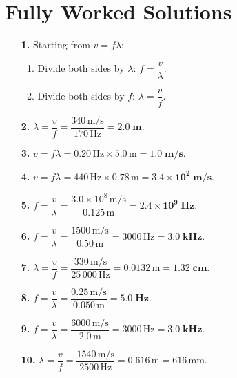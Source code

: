 \documentclass[12pt]{article}
\begin{document}
\newpage
\section*{Fully Worked Solutions}

\begin{enumerate}
    \item[\textbf{1.}] Starting from \(v = f\lambda\):
        \begin{enumerate}
            \item Divide both sides by \(\lambda\): \(f = \dfrac{v}{\lambda}\).
            \item Divide both sides by \(f\): \(\lambda = \dfrac{v}{f}\).
        \end{enumerate}

    \item[\textbf{2.}] \(\lambda = \dfrac{v}{f} = \dfrac{340\,\text{m/s}}{170\,\text{Hz}} = \mathbf{2.0\;m}\).

    \item[\textbf{3.}] \(v = f\lambda = 0.20\,\text{Hz} \times 5.0\,\text{m} = \mathbf{1.0\;m/s}\).

    \item[\textbf{4.}] \(v = f\lambda = 440\,\text{Hz} \times 0.78\,\text{m} = \mathbf{3.4 \times 10^{2}\;m/s}\).

    \item[\textbf{5.}] \(f = \dfrac{v}{\lambda} = \dfrac{3.0\times10^{8}\,\text{m/s}}{0.125\,\text{m}} = \mathbf{2.4 \times 10^{9}\;Hz}\).

    \item[\textbf{6.}] \(f = \dfrac{v}{\lambda} = \dfrac{1500\,\text{m/s}}{0.50\,\text{m}} = 3000\,\text{Hz} = \mathbf{3.0\;kHz}\).

    \item[\textbf{7.}] \(\lambda = \dfrac{v}{f} = \dfrac{330\,\text{m/s}}{25\,000\,\text{Hz}} = 0.0132\,\text{m} = \mathbf{1.32\;cm}\).

    \item[\textbf{8.}] \(f = \dfrac{v}{\lambda} = \dfrac{0.25\,\text{m/s}}{0.050\,\text{m}} = \mathbf{5.0\;Hz}\).

    \item[\textbf{9.}] \(f = \dfrac{v}{\lambda} = \dfrac{6000\,\text{m/s}}{2.0\,\text{m}} = 3000\,\text{Hz} = \mathbf{3.0\;kHz}\).

    \item[\textbf{10.}] \(\lambda = \dfrac{v}{f} = \dfrac{1540\,\text{m/s}}{2500\,\text{Hz}} = 0.616\,\text{m} = 616\,\text{mm}\).


\end{enumerate}
\end{document}
